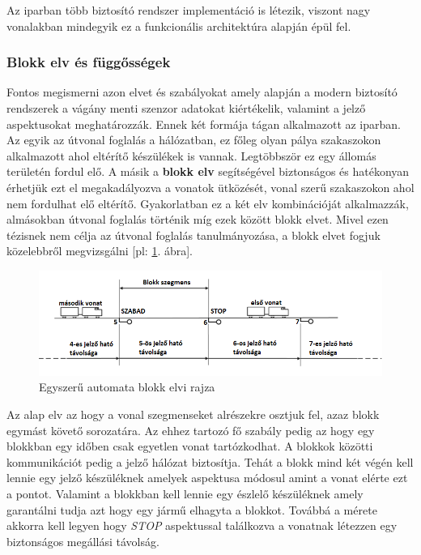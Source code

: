 \documentclass[a4paper,12pt]{article}
\begin{document}
Az iparban több biztosító rendszer implementáció is létezik, viszont nagy vonalakban mindegyik ez a funkcionális architektúra alapján épül fel.

\subsubsection{Blokk elv és függősségek}
Fontos megismerni azon elvet és szabályokat amely alapján a modern biztosító rendszerek a vágány menti szenzor adatokat kiértékelik, valamint a jelző aspektusokat meghatározzák.
Ennek két formája tágan alkalmazott az iparban. 
Az egyik az útvonal foglalás a hálózatban, ez főleg olyan pálya szakaszokon alkalmazott ahol eltérítő készülékek is vannak.
Legtöbbször ez egy állomás területén fordul elő.
A másik a \textbf{blokk elv} segítségével biztonságos és hatékonyan érhetjük ezt el megakadályozva a vonatok ütközését, vonal szerű szakaszokon ahol nem fordulhat elő eltérítő.
Gyakorlatban ez a két elv kombinációját alkalmazzák, almásokban útvonal foglalás történik míg ezek között blokk elvet.
Mivel ezen tézisnek nem célja az útvonal foglalás tanulmányozása, a blokk elvet fogjuk közelebbről megvizsgálni [pl: \ref{fig:automatic_block}. ábra].

\begin{figure}[htp]
	\centering
	\includegraphics[width=\linewidth]{images/automatic_block.png}
	\caption[Automata blokk]{Egyszerű automata blokk elvi rajza}
	\label{fig:automatic_block}
\end{figure}

Az alap elv az hogy a vonal szegmenseket alrészekre osztjuk fel, azaz blokk egymást követő sorozatára.
Az ehhez tartozó fő szabály pedig az hogy egy blokkban egy időben csak egyetlen vonat tartózkodhat.
A blokkok közötti kommunikációt pedig a jelző hálózat biztosítja.
Tehát a blokk mind két végén kell lennie egy jelző készüléknek amelyek aspektusa módosul amint a vonat elérte ezt a pontot.
Valamint a blokkban kell lennie egy észlelő készüléknek amely garantálni tudja azt hogy egy jármű elhagyta a blokkot.
Továbbá a mérete akkorra kell legyen hogy \textit{STOP} aspektussal találkozva a vonatnak létezzen egy biztonságos megállási távolság.
\end{document}

